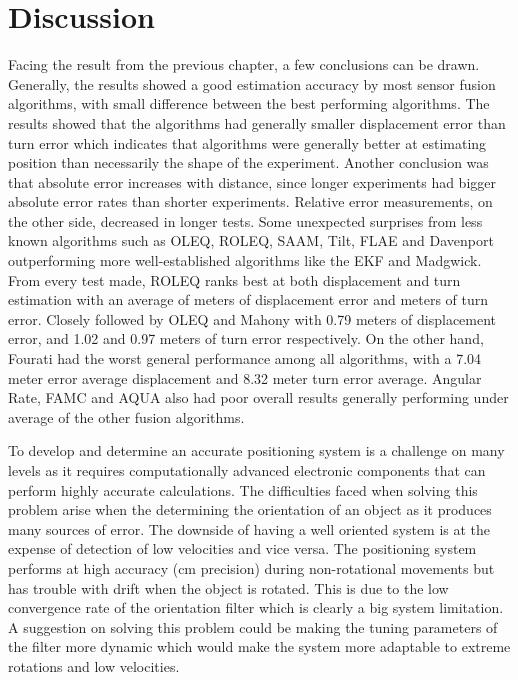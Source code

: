 \section{Discussion}
Facing the result from the previous chapter, a few conclusions can be drawn. Generally, the results showed a good estimation accuracy by most sensor fusion algorithms, with small difference between the best performing algorithms. The results showed that the algorithms had generally smaller displacement error than turn error which indicates that algorithms were generally better at estimating position than necessarily the shape of the experiment. Another conclusion was that absolute error increases with distance, since longer experiments had bigger absolute error rates than shorter experiments. Relative error measurements, on the other side, decreased in longer tests. Some unexpected surprises from less known algorithms such as OLEQ, ROLEQ, SAAM, Tilt, FLAE and Davenport outperforming more well-established algorithms like the EKF and Madgwick. From every test made, ROLEQ ranks best at both displacement and turn estimation with an average of  meters of displacement error and  meters of turn error. Closely followed by OLEQ and Mahony with 0.79 meters of displacement error, and 1.02 and 0.97 meters of turn error respectively. On the other hand, Fourati had the worst general performance among all algorithms, with a 7.04 meter error average displacement and 8.32 meter turn error average. Angular Rate, FAMC and AQUA also had poor overall results generally performing under average of the other fusion algorithms.
\vspace{-0.5cm}

\vspace{-1.5cm}
To develop and determine an accurate positioning system is a challenge on many levels as it requires computationally advanced electronic components that can perform highly accurate calculations. The difficulties faced when solving this problem arise when the determining the orientation of an object as it produces many sources of error. The downside of having a well oriented system is at the expense of detection of low velocities and vice versa. The positioning system performs at high accuracy (cm precision) during non-rotational movements but has trouble with drift when the object is rotated. This is due to the low convergence rate of the orientation filter which is clearly a big system limitation. A suggestion on solving this problem could be making the tuning parameters of the filter more dynamic which would make the system more adaptable to extreme rotations and low velocities.

